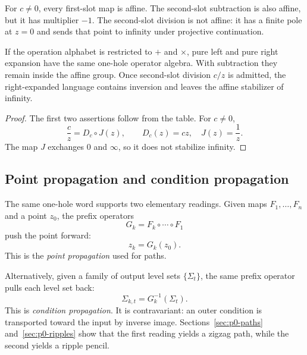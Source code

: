 For $c\ne0$, every first-slot map is affine.  The second-slot subtraction is
also affine, but it has multiplier $-1$.  The second-slot division is not
affine: it has a finite pole at $z=0$ and sends that point to infinity under
projective continuation.

\begin{corollary}
\label{cor:p0-affine-projective-break}
If the operation alphabet is restricted to $+$ and $\times$, pure left and
pure right expansion have the same one-hole operator algebra.  With
subtraction they remain inside the affine group.  Once second-slot division
$c/z$ is admitted, the right-expanded language contains inversion and leaves
the affine stabilizer of infinity.
\end{corollary}

\begin{proof}
The first two assertions follow from the table.  For $c\ne0$,
\[
  \frac{c}{z}=D_c\circ J(z),
  \qquad D_c(z)=cz,\quad J(z)=\frac1z.
\]
The map $J$ exchanges $0$ and $\infty$, so it does not stabilize infinity.
\end{proof}

\subsection{Point propagation and condition propagation}

The same one-hole word supports two elementary readings.  Given maps
$F_1,\ldots,F_n$ and a point $z_0$, the prefix operators
\[
  G_k=F_k\circ\cdots\circ F_1
\]
push the point forward:
\[
  z_k=G_k(z_0).
\]
This is the \emph{point propagation} used for paths.

Alternatively, given a family of output level sets $\{\Sigma_t\}$, the same
prefix operator pulls each level set back:
\[
  \Sigma_{k,t}=G_k^{-1}(\Sigma_t).
\]
This is \emph{condition propagation}.  It is contravariant: an outer condition
is transported toward the input by inverse image.  Sections~\ref{sec:p0-paths}
and~\ref{sec:p0-ripples} show that the first reading yields a zigzag path,
while the second yields a ripple pencil.
